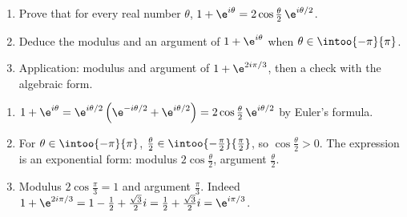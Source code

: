 \begin{exercise}
\begin{enumerate}
\item Prove that for every real number $\theta$, $1+\e^{i\theta}=2\cos\frac\theta2\,\e^{i\theta/2}$.
\item Deduce the modulus and an argument of $1+\e^{i\theta}$ when $\theta\in\intoo{-\pi}{\pi}$.
\item Application: modulus and argument of $1+\e^{2i\pi/3}$, then a check with the algebraic form.
\end{enumerate}
\end{exercise}
\begin{solution}
\begin{enumerate}
\item $1+\e^{i\theta}=\e^{i\theta/2}\left(\e^{-i\theta/2}+\e^{i\theta/2}\right)=2\cos\frac\theta2\,\e^{i\theta/2}$ by Euler's formula.
\item For $\theta\in\intoo{-\pi}{\pi}$, $\frac\theta2\in\intoo{-\frac\pi2}{\frac\pi2}$, so $\cos\frac\theta2>0$. The expression is an exponential form: modulus $2\cos\frac\theta2$, argument $\frac\theta2$.
\item Modulus $2\cos\frac\pi3=1$ and argument $\frac\pi3$. Indeed $1+\e^{2i\pi/3}=1-\frac12+\frac{\sqrt3}2i=\frac12+\frac{\sqrt3}2i=\e^{i\pi/3}$.
\end{enumerate}
\end{solution}

